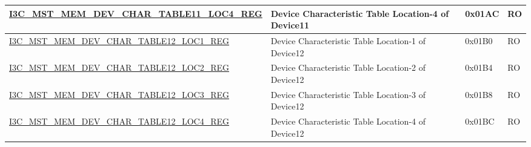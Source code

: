 \begin{longtable}{ | p{8cm} | p{5.5cm} | p{1.3cm} | p{1cm} | }
\hyperref[regdesc:I3CMSTMEMDEVCHARTABLENLOCMREG]{I3C\_MST\_MEM\_DEV\_CHAR\_TABLE11\_LOC4\_REG} & Device Characteristic Table Location-4 of Device11 & 0x01AC & RO \\ \hline
\hyperref[regdesc:I3CMSTMEMDEVCHARTABLENLOCMREG]{I3C\_MST\_MEM\_DEV\_CHAR\_TABLE12\_LOC1\_REG} & Device Characteristic Table Location-1 of Device12 & 0x01B0 & RO \\ \hline
\hyperref[regdesc:I3CMSTMEMDEVCHARTABLENLOCMREG]{I3C\_MST\_MEM\_DEV\_CHAR\_TABLE12\_LOC2\_REG} & Device Characteristic Table Location-2 of Device12 & 0x01B4 & RO \\ \hline
\hyperref[regdesc:I3CMSTMEMDEVCHARTABLENLOCMREG]{I3C\_MST\_MEM\_DEV\_CHAR\_TABLE12\_LOC3\_REG} & Device Characteristic Table Location-3 of Device12 & 0x01B8 & RO \\ \hline
\hyperref[regdesc:I3CMSTMEMDEVCHARTABLENLOCMREG]{I3C\_MST\_MEM\_DEV\_CHAR\_TABLE12\_LOC4\_REG} & Device Characteristic Table Location-4 of Device12 & 0x01BC & RO \\ \hline
\end{longtable}

